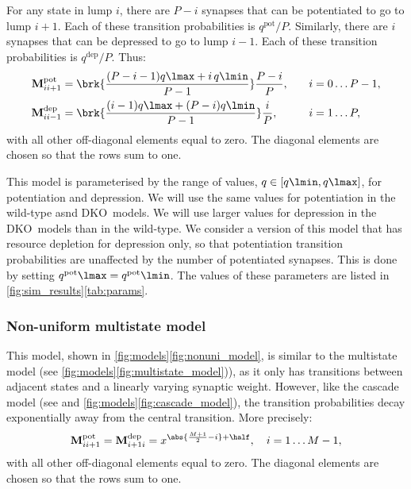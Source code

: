 \documentclass[10pt]{article}
\newcommand{\M}{\mathbf{M}}
\newcommand{\pot}{^{\text{pot}}}
\newcommand{\dep}{^{\text{dep}}}
\newcommand{\KO}{DKO}
\begin{document}
For any state in lump $i$, there are $P-i$ synapses that can be potentiated to go to lump $i+1$.
Each of these transition probabilities is $q\pot/P$.
Similarly, there are $i$ synapses that can be depressed to go to lump $i-1$.
Each of these transition probabilities is $q\dep/P$.
Thus:
%
\begin{equation}\label{eq:pooledpotdep}
  \begin{aligned}
    \M\pot_{ii+1} &=  \brk{\frac{(P-i-1)q\lmax + i\,q\lmin}{P-1}} \frac{P-i}{P} ,
      \quad& i &= 0 \ldots P-1,\\
    \M\dep_{ii-1} &=  \brk{\frac{(i-1)q\lmax + (P-i)q\lmin}{P-1}} \frac{i}{P} ,
           & i &= 1 \ldots P,
  \end{aligned}
\end{equation}
%
with all other off-diagonal elements equal to zero.
The diagonal elements are chosen so that the rows sum to one.

This model is parameterised by the range of values, $q\in[q\lmin,q\lmax]$, for potentiation and depression.
We will use the same values for potentiation in the wild-type asnd \KO\ models.
We will use larger values for depression in the \KO\ models than in the wild-type.
We consider a version of this model that has resource depletion for depression only, so that potentiation transition probabilities are unaffected by the number of potentiated synapses.
This is done by setting $q\pot\lmax=q\pot\lmin$.
The values of these parameters are listed in \autoref{fig:sim_results}\ref{tab:params}.




\subsubsection{Non-uniform multistate model}\label{sec:nonunimodel}

This model, shown in \autoref{fig:models}\ref{fig:nonuni_model}, is similar to the multistate model (see \autoref{fig:models}\ref{fig:multistate_model})), as it only has transitions between adjacent states and a linearly varying synaptic weight.
However, like the cascade model (see \cite{Fusi2005cascade} and \autoref{fig:models}\ref{fig:cascade_model}), the transition probabilities decay exponentially away from the central transition.
More precisely:
%
\begin{equation}\label{eq:nonunidef}
    \M\pot_{ii+1} = \M\dep_{i+1i} =  x^{\abs{\frac{M+1}{2}-i}+\half},
      \quad i = 1 \ldots M-1,
\end{equation}
%
with all other off-diagonal elements equal to zero.
The diagonal elements are chosen so that the rows sum to one.
\end{document}
